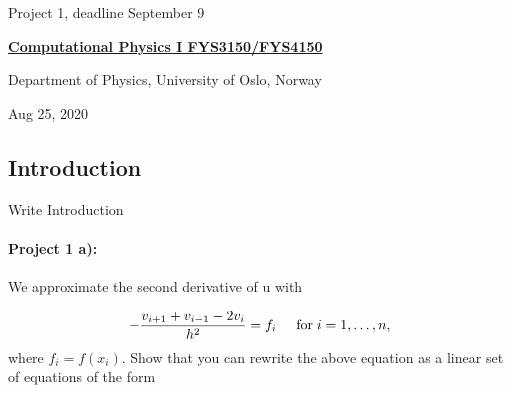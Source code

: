 \documentclass[%
oneside,                 %
final,                   %
10pt]{article}
\begin{document}

\newcommand{\exercisesection}[1]{\subsection*{#1}}






\thispagestyle{empty}

\begin{center}
{\LARGE\bf
\begin{spacing}{1.25}
Project 1, deadline  September 9
\end{spacing}
}
\end{center}


\begin{center}
{\bf \href{{http://www.uio.no/studier/emner/matnat/fys/FYS3150/index-eng.html}}{Computational Physics I FYS3150/FYS4150}}
\end{center}

    \begin{center}
\centerline{{\small Department of Physics, University of Oslo, Norway}}
\end{center}
    

\begin{center}
Aug 25, 2020
\end{center}

\vspace{1cm}


\subsection*{Introduction}
Write Introduction



\paragraph{Project 1 a):}

We approximate the second derivative of u with

\begin{equation*}
   -\frac{v_{i+1}+v_{i-1}-2v_i}{h^2} = f_i  \hspace{0.5cm} \mathrm{for} \hspace{0.1cm} i=1,\dots, n,
\end{equation*}
where $f_i=f(x_i)$.
Show that you can rewrite the above equation as a linear set of equations of the form
\end{document}
